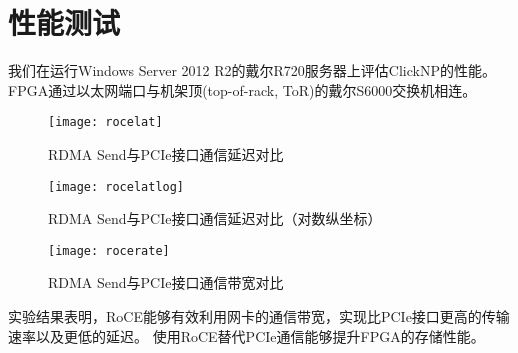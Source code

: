 \chapter{性能测试}
我们在运行Windows Server 2012 R2的戴尔R720服务器上评估ClickNP的性能。
FPGA通过以太网端口与机架顶(top-of-rack, ToR)的戴尔S6000交换机\cite{s6000}相连。

\begin{figure}[htbp]
\centering
\texttt{[image: rocelat]}
\caption{RDMA Send与PCIe接口通信延迟对比} \label{fig:rocelat}
\end{figure}

\begin{figure}[htbp]
\centering
\texttt{[image: rocelatlog]}
\caption{RDMA Send与PCIe接口通信延迟对比（对数纵坐标）} \label{fig:rocelatlog}
\end{figure}

\begin{figure}[htbp]
\centering
\texttt{[image: rocerate]}
\caption{RDMA Send与PCIe接口通信带宽对比} \label{fig:rocerate}
\end{figure}

实验结果表明，RoCE能够有效利用网卡的通信带宽，实现比PCIe接口更高的传输速率以及更低的延迟。
使用RoCE替代PCIe通信能够提升FPGA的存储性能。
